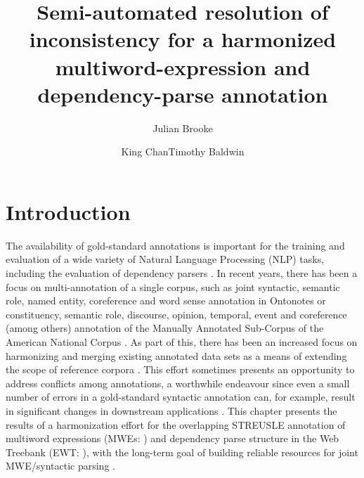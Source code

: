 \documentclass[output=paper,modfonts,nonflat]{langsci/langscibook}
\title{Semi-automated resolution of inconsistency for a harmonized multiword-expression and dependency-parse annotation}
\author{ Julian Brooke\affiliation{The University of Melbourne}\and  King Chan\affiliation{The University of Melbourne}\lastand  Timothy Baldwin \affiliation{The University of Melbourne}}
\begin{document}

\maketitle
\label{BROOKE-CHAPTER}

\section{Introduction}

The availability of gold-standard annotations is important for the training and evaluation of a wide variety of Natural Language Processing (NLP) tasks, including the evaluation of dependency parsers \citep{Buchholz:2006:CST:1596276.1596305}. In recent years, there has been a focus on multi-annotation of a single corpus, such as joint syntactic, semantic role, named entity, coreference and word sense annotation in Ontonotes \citep{Hovy+:2006} or constituency, semantic role, discourse, opinion, temporal, event and coreference (among others) annotation of the Manually Annotated Sub-Corpus of the American National Corpus \citep{Ide+:2010}. As part of this, there has been an increased focus on harmonizing and merging existing annotated data sets as a means of extending the scope of reference corpora \citep{Ide:2007:GGF:1642059.1642060,Declerk08,SimiMB15}.  This effort sometimes presents an opportunity to address conflicts among annotations, a worthwhile endeavour since even a small number of errors in a gold-standard syntactic annotation can, for example, result in significant changes in downstream applications \citep{habash2007determining}. This chapter presents the results of a harmonization effort for the overlapping STREUSLE annotation \citep{schneider2014} of multiword expressions (MWEs: \citealt{baldwin2010multiword}) and dependency parse structure in the  Web Treebank (EWT: \citealt{EWT}), with the long-term goal of building reliable resources for joint MWE/syntactic parsing \citep{constant-nivre:acl:2016}.
\end{document}
